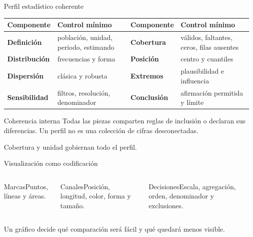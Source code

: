 \documentclass[aspectratio=169,11pt]{beamer}
\newcommand{\br}{\\}
\begin{document}
\begin{frame}{Perfil estadístico coherente}
  \footnotesize
  \begin{tabularx}{\textwidth}{>{\bfseries}p{} X >{\bfseries}p{} X}
    \toprule
    Componente & Control mínimo & Componente & Control mínimo \\
    \midrule
    Definición & población, unidad, periodo, estimando & Cobertura & válidos, faltantes, ceros, filas ausentes \\
    Distribución & frecuencias y forma & Posición & centro y cuantiles \\
    Dispersión & clásica y robusta & Extremos & plausibilidad e influencia \\
    Sensibilidad & filtros, resolución, denominador & Conclusión & afirmación permitida y límite \\
    \bottomrule
  \end{tabularx}
  \vspace{.8em}
  \begin{block}{Coherencia interna}
    Todas las piezas comparten reglas de inclusión o declaran sus diferencias. Un perfil no es una colección de cifras desconectadas.
  \end{block}
  \centering\alert{Cobertura y unidad gobiernan todo el perfil.}
\end{frame}

\begin{frame}{Visualización como codificación}
  \centering
  \vspace{.8em}
  \begin{columns}[T]
      \begin{block}{Marcas}Puntos, líneas y áreas.\end{block}
      \begin{block}{Canales}Posición, longitud, color, forma y tamaño.\end{block}
      \begin{block}{Decisiones}Escala, agregación, orden, denominador y exclusiones.\end{block}
  \end{columns}
  \vfill
  \centering Un gráfico decide qué comparación será fácil y qué quedará menos visible.
\end{frame}
\end{document}
